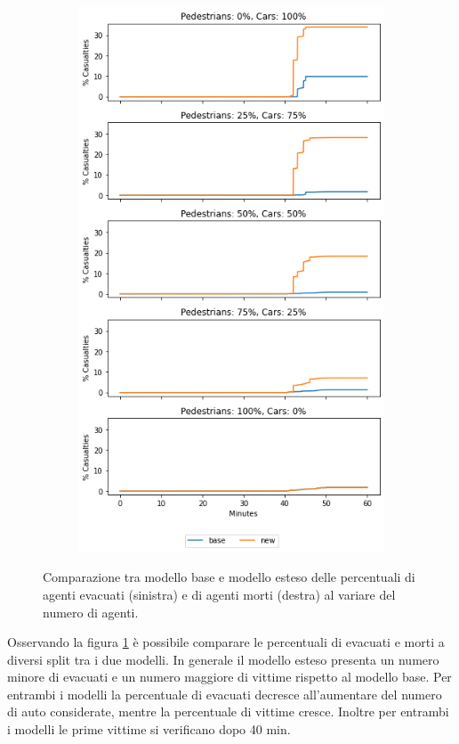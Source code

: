 \begin{figure}[h]
\begin{subfigure}{0.45\textwidth}
        \includegraphics[width=\textwidth]{images/analisi/comparison-total-casualties.png}
    \end{subfigure}
    \caption{Comparazione tra modello base e modello esteso delle percentuali di agenti evacuati (sinistra) e di agenti morti (destra) al variare del numero di agenti.}
    \label{fig:analisi-comparison-total-ec}
\end{figure}

Osservando la figura \ref{fig:analisi-comparison-total-ec} è possibile comparare le percentuali di evacuati e morti a diversi split tra i due modelli.
In generale il modello esteso presenta un numero minore di evacuati e un numero maggiore di vittime rispetto al modello base.
Per entrambi i modelli la percentuale di evacuati decresce all'aumentare del numero di auto considerate, mentre la percentuale di vittime cresce.
Inoltre per entrambi i modelli le prime vittime si verificano dopo 40 min.

